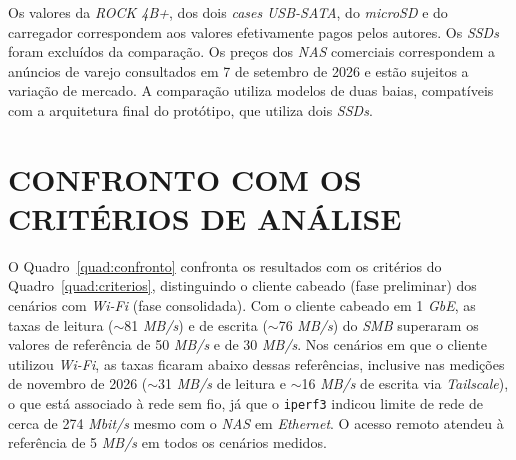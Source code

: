 Os valores da \textit{ROCK 4B+}, dos dois \textit{cases} \textit{USB-SATA}, do \textit{microSD} e do carregador correspondem aos valores efetivamente pagos pelos autores. Os \textit{SSDs} foram excluídos da comparação. Os preços dos \textit{NAS} comerciais correspondem a anúncios de varejo consultados em 7 de setembro de 2026 e estão sujeitos a variação de mercado. A comparação utiliza modelos de duas baias, compatíveis com a arquitetura final do protótipo, que utiliza dois \textit{SSDs}.

\section{CONFRONTO COM OS CRITÉRIOS DE ANÁLISE}

O Quadro~\ref{quad:confronto} confronta os resultados com os critérios do Quadro~\ref{quad:criterios}, distinguindo o cliente cabeado (fase preliminar) dos cenários com \textit{Wi-Fi} (fase consolidada). Com o cliente cabeado em 1 \textit{GbE}, as taxas de leitura ($\sim$81 \textit{MB/s}) e de escrita ($\sim$76 \textit{MB/s}) do \textit{SMB} superaram os valores de referência de 50 \textit{MB/s} e de 30 \textit{MB/s}. Nos cenários em que o cliente utilizou \textit{Wi-Fi}, as taxas ficaram abaixo dessas referências, inclusive nas medições de novembro de 2026 ($\sim$31 \textit{MB/s} de leitura e $\sim$16 \textit{MB/s} de escrita via \textit{Tailscale}), o que está associado à rede sem fio, já que o \texttt{iperf3} indicou limite de rede de cerca de 274 \textit{Mbit/s} mesmo com o \textit{NAS} em \textit{Ethernet}. O acesso remoto atendeu à referência de 5 \textit{MB/s} em todos os cenários medidos.

